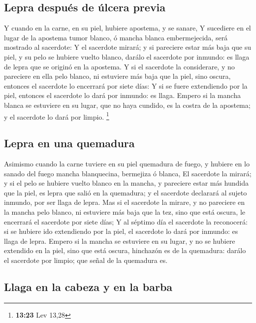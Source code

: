 \hypertarget{lepra-despuuxe9s-de-uxfalcera-previa}{%
\subsection{Lepra después de úlcera
previa}\label{lepra-despuuxe9s-de-uxfalcera-previa}}

 Y cuando en la carne, en su piel, hubiere apostema, y se
sanare,  Y sucediere en el lugar de la apostema tumor
blanco, ó mancha blanca embermejecida, será mostrado al sacerdote:
 Y el sacerdote mirará; y si pareciere estar más baja que
su piel, y su pelo se hubiere vuelto blanco, darálo el sacerdote por
inmundo: es llaga de lepra que se originó en la apostema.
 Y si el sacerdote la considerare, y no pareciere en ella
pelo blanco, ni estuviere más baja que la piel, sino oscura, entonces el
sacerdote lo encerrará por siete días:  Y si se fuere
extendiendo por la piel, entonces el sacerdote lo dará por inmundo: es
llaga.  Empero si la mancha blanca se estuviere en su
lugar, que no haya cundido, es la costra de la apostema; y el sacerdote
lo dará por limpio. \footnote{\textbf{13:23} Lev 13,28}

\hypertarget{lepra-en-una-quemadura}{%
\subsection{Lepra en una quemadura}\label{lepra-en-una-quemadura}}

 Asimismo cuando la carne tuviere en su piel quemadura de
fuego, y hubiere en lo sanado del fuego mancha blanquecina, bermejiza ó
blanca,  El sacerdote la mirará; y si el pelo se hubiere
vuelto blanco en la mancha, y pareciere estar más hundida que la piel,
es lepra que salió en la quemadura; y el sacerdote declarará al sujeto
inmundo, por ser llaga de lepra.  Mas si el sacerdote la
mirare, y no pareciere en la mancha pelo blanco, ni estuviere más baja
que la tez, sino que está oscura, le encerrará el sacerdote por siete
días;  Y al séptimo día el sacerdote la reconocerá: si se
hubiere ido extendiendo por la piel, el sacerdote lo dará por inmundo:
es llaga de lepra.  Empero si la mancha se estuviere en
su lugar, y no se hubiere extendido en la piel, sino que está oscura,
hinchazón es de la quemadura: darálo el sacerdote por limpio; que señal
de la quemadura es.

\hypertarget{llaga-en-la-cabeza-y-en-la-barba}{%
\subsection{Llaga en la cabeza y en la
barba}\label{llaga-en-la-cabeza-y-en-la-barba}}

